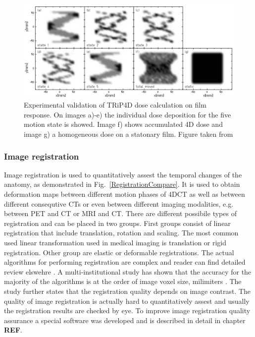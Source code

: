 \documentclass[type=dr, dr=rernat, accentcolor=tud7b,colorbacktitle, bigchapter, openright, twoside, 12pt ]{tudthesis}
\begin{document}
\begin{figure}[H]
\begin{center}
\includegraphics[scale=0.35]{./Images/4DtreatmentPlanning.png}
\caption{Experimental validation of TRiP4D dose calculation on film response. On images a)-e) the individual dose deposition for the five motion state is showed.
Image f) shows accumulated 4D dose and image g) a homogeneous dose on a statonary film. Figure taken from \cite{Richter12}}
\label{TRiP4Ddose}
\end{center}
\end{figure}

\subsubsection{Image registration}
\label{sec:registration}

Image registration is used to quantitatively assest the temporal changes of the anatomy, as demonstrated in Fig.~\ref{RegistrationCompare}. It is used to obtain deformation maps between different motion phases of 4DCT
as well as between different consequtive CTs or even between different imaging modalities, e.g. between PET and CT or MRI and CT. There are different possibile types of
registration and can be placed in two groups. First groups consist of linear registration that include translation, rotation and scaling. The most common used linear transformation used
in medical imaging is translation or rigid registration. Other group are elastic or deformable registrations. The actual algorithms for performing registration are complex and reader can
find detailed review elswehre \cite{Hill2001,Brock2006,Rietzel2006a}. A multi-institutional study has shown that the accuracy for the majority of the algorithms is at the order of image voxel
size, \ie milimiters \cite{Brock2010}. The study further states that the registration quality depends on image contrast. The quality of image registration is actually hard to quantitatively
assest and usually the registration results are checked by eye. To improve image registration quality assurance a special software was developed and is described in detail in chapter \textbf{REF}.
\end{document}
